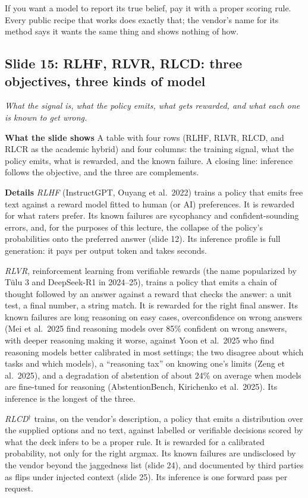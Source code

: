 \documentclass[11pt,letterpaper]{article}
\newcommand{\slide}[3]{%
  \subsection[Slide #1: #2]{Slide #1: #2}%
  {\color{muted}\itshape #3\par}\medskip}
\newcommand{\para}[1]{\medskip\noindent\textbf{#1}\quad}
\newenvironment{intuition}{\begin{tcolorbox}[intuitionbox]}{\end{tcolorbox}}
\begin{document}
\begin{intuition}
If you want a model to report its true belief, pay it with a proper scoring rule. Every public recipe that works does exactly that; the vendor's name for its method says it wants the same thing and shows nothing of how.
\end{intuition}

\slide{15}{RLHF, RLVR, RLCD: three objectives, three kinds of model}{What the signal is, what the policy emits, what gets rewarded, and what each one is known to get wrong.}

\para{What the slide shows} A table with four rows (RLHF, RLVR, RLCD, and RLCR as the academic hybrid) and four columns: the training signal, what the policy emits, what is rewarded, and the known failure. A closing line: inference follows the objective, and the three are complements.

\para{Details} \emph{RLHF} (InstructGPT, Ouyang et al.\ 2022) trains a policy that emits free text against a reward model fitted to human (or AI) preferences. It is rewarded for what raters prefer. Its known failures are sycophancy and confident-sounding errors, and, for the purposes of this lecture, the collapse of the policy's probabilities onto the preferred answer (slide 12). Its inference profile is full generation: it pays per output token and takes seconds.

\emph{RLVR}, reinforcement learning from verifiable rewards (the name popularized by T\"ulu 3 and DeepSeek-R1 in 2024--25), trains a policy that emits a chain of thought followed by an answer against a reward that checks the answer: a unit test, a final number, a string match. It is rewarded for the right final answer. Its known failures are long reasoning on easy cases, overconfidence on wrong answers (Mei et al.\ 2025 find reasoning models over 85\% confident on wrong answers, with deeper reasoning making it worse, against Yoon et al.\ 2025 who find reasoning models better calibrated in most settings; the two disagree about which tasks and which models), a ``reasoning tax'' on knowing one's limits (Zeng et al.\ 2025), and a degradation of abstention of about 24\% on average when models are fine-tuned for reasoning (AbstentionBench, Kirichenko et al.\ 2025). Its inference is the longest of the three.

\emph{RLCD}$^\dagger$ trains, on the vendor's description, a policy that emits a distribution over the supplied options and no text, against labelled or verifiable decisions scored by what the deck infers to be a proper rule. It is rewarded for a calibrated probability, not only for the right argmax. Its known failures are undisclosed by the vendor beyond the jaggedness list (slide 24), and documented by third parties as flips under injected context (slide 25). Its inference is one forward pass per request.
\end{document}
